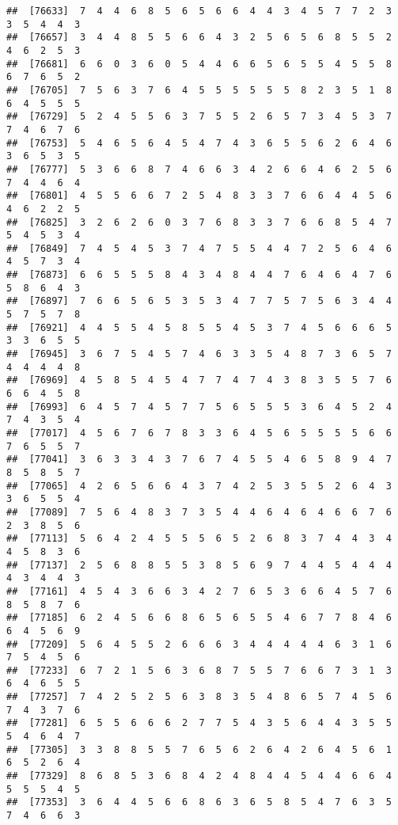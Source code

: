 \documentclass[
]{book}
\begin{document}
\begin{verbatim}
##  [76633]  7  4  4  6  8  5  6  5  6  6  4  4  3  4  5  7  7  2  3  3  5  4  4  3
##  [76657]  3  4  4  8  5  5  6  6  4  3  2  5  6  5  6  8  5  5  2  4  6  2  5  3
##  [76681]  6  6  0  3  6  0  5  4  4  6  6  5  6  5  5  4  5  5  8  6  7  6  5  2
##  [76705]  7  5  6  3  7  6  4  5  5  5  5  5  5  8  2  3  5  1  8  6  4  5  5  5
##  [76729]  5  2  4  5  5  6  3  7  5  5  2  6  5  7  3  4  5  3  7  7  4  6  7  6
##  [76753]  5  4  6  5  6  4  5  4  7  4  3  6  5  5  6  2  6  4  6  3  6  5  3  5
##  [76777]  5  3  6  6  8  7  4  6  6  3  4  2  6  6  4  6  2  5  6  7  4  4  6  4
##  [76801]  4  5  5  6  6  7  2  5  4  8  3  3  7  6  6  4  4  5  6  4  6  2  2  5
##  [76825]  3  2  6  2  6  0  3  7  6  8  3  3  7  6  6  8  5  4  7  5  4  5  3  4
##  [76849]  7  4  5  4  5  3  7  4  7  5  5  4  4  7  2  5  6  4  6  4  5  7  3  4
##  [76873]  6  6  5  5  5  8  4  3  4  8  4  4  7  6  4  6  4  7  6  5  8  6  4  3
##  [76897]  7  6  6  5  6  5  3  5  3  4  7  7  5  7  5  6  3  4  4  5  7  5  7  8
##  [76921]  4  4  5  5  4  5  8  5  5  4  5  3  7  4  5  6  6  6  5  3  3  6  5  5
##  [76945]  3  6  7  5  4  5  7  4  6  3  3  5  4  8  7  3  6  5  7  4  4  4  4  8
##  [76969]  4  5  8  5  4  5  4  7  7  4  7  4  3  8  3  5  5  7  6  6  6  4  5  8
##  [76993]  6  4  5  7  4  5  7  7  5  6  5  5  5  3  6  4  5  2  4  7  4  3  5  4
##  [77017]  4  5  6  7  6  7  8  3  3  6  4  5  6  5  5  5  5  6  6  7  6  5  5  7
##  [77041]  3  6  3  3  4  3  7  6  7  4  5  5  4  6  5  8  9  4  7  8  5  8  5  7
##  [77065]  4  2  6  5  6  6  4  3  7  4  2  5  3  5  5  2  6  4  3  3  6  5  5  4
##  [77089]  7  5  6  4  8  3  7  3  5  4  4  6  4  6  4  6  6  7  6  2  3  8  5  6
##  [77113]  5  6  4  2  4  5  5  5  6  5  2  6  8  3  7  4  4  3  4  4  5  8  3  6
##  [77137]  2  5  6  8  8  5  5  3  8  5  6  9  7  4  4  5  4  4  4  4  3  4  4  3
##  [77161]  4  5  4  3  6  6  3  4  2  7  6  5  3  6  6  4  5  7  6  8  5  8  7  6
##  [77185]  6  2  4  5  6  6  8  6  5  6  5  5  4  6  7  7  8  4  6  6  4  5  6  9
##  [77209]  5  6  4  5  5  2  6  6  6  3  4  4  4  4  4  6  3  1  6  7  5  4  5  6
##  [77233]  6  7  2  1  5  6  3  6  8  7  5  5  7  6  6  7  3  1  3  6  4  6  5  5
##  [77257]  7  4  2  5  2  5  6  3  8  3  5  4  8  6  5  7  4  5  6  7  4  3  7  6
##  [77281]  6  5  5  6  6  6  2  7  7  5  4  3  5  6  4  4  3  5  5  5  4  6  4  7
##  [77305]  3  3  8  8  5  5  7  6  5  6  2  6  4  2  6  4  5  6  1  6  5  2  6  4
##  [77329]  8  6  8  5  3  6  8  4  2  4  8  4  4  5  4  4  6  6  4  5  5  5  4  5
##  [77353]  3  6  4  4  5  6  6  8  6  3  6  5  8  5  4  7  6  3  5  7  4  6  6  3

\end{verbatim}
\end{document}
